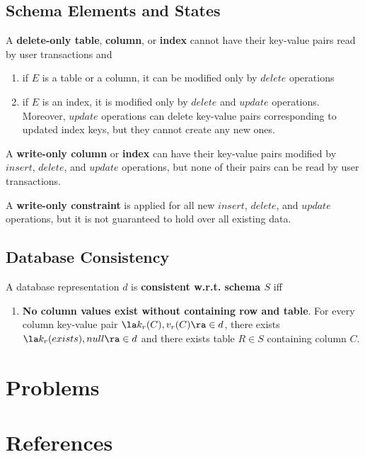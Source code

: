\documentclass[11pt]{article}
\begin{document}
\subsection{Schema Elements and States}
\label{sec:orgca0eade}
\begin{definition}[]
A \textbf{delete-only table}, \textbf{column}, or \textbf{index} cannot have their key-value pairs read by user transactions and
\begin{enumerate}
\item if \(E\) is a table or a column, it can be modified only by \(delete\) operations
\item if \(E\) is an index, it is modified only by \(delete\) and \(update\) operations. Moreover,
\(update\) operations can delete key-value pairs corresponding to updated index keys, but they
cannot create any new ones.
\end{enumerate}
\end{definition}

\begin{definition}[]
A \textbf{write-only column} or \textbf{index} can have their key-value pairs modified by \(insert\), \(delete\), and
\(update\) operations, but none of their pairs can be read by user transactions.
\end{definition}

\begin{definition}[]
A \textbf{write-only constraint} is applied for all new \(insert\), \(delete\), and \(update\) operations, but
it is not guaranteed to hold over all existing data.
\end{definition}
\subsection{Database Consistency}
\label{sec:org3b4806a}
\begin{definition}[]
A database representation \(d\) is \textbf{consistent w.r.t. schema \(S\)} iff
\begin{enumerate}
\item \textbf{No column values exist without containing  row and table}. For every column key-value pair
\(\la k_r(C),v_r(C)\ra\in d\), there exists \(\la k_r(exists),null\ra\in d\) and there exists table
\(R\in S\) containing column \(C\).
\end{enumerate}
\end{definition}
\section{Problems}
\label{sec:org86ffa06}


\section{References}
\label{sec:org95be0a3}
\label{bibliographystyle link}


\label{bibliography link}

\end{document}
